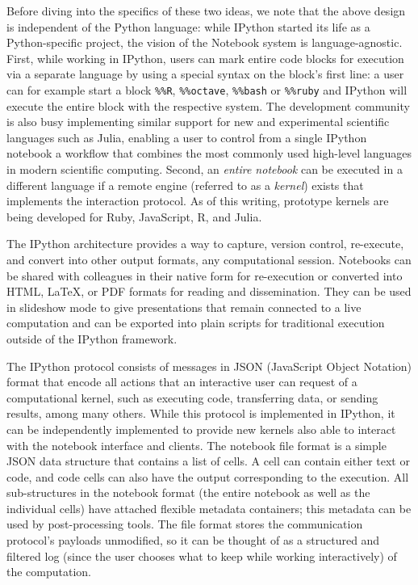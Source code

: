 \documentclass[11pt,oneside,english]{article}
\begin{document}
Before diving into the specifics of these two ideas, we note that the above
design is independent of the Python language: while IPython started its life as
a Python-specific project, the vision of the Notebook system is
language-agnostic.  First, while working in IPython, users can mark entire code
blocks for execution via a separate language by using a special syntax on the
block's first line: a user can for example start a block \texttt{\%\%R},
\texttt{\%\%octave}, \texttt{\%\%bash} or \texttt{\%\%ruby} and IPython will
execute the entire block with the respective system.  The development community
is also busy implementing similar support for new and experimental
scientific languages such as Julia, enabling a user to control from a single
IPython notebook a workflow that combines the most commonly used high-level
languages in modern scientific computing.  Second, an \emph{entire notebook}
can be executed in a different language if a remote engine (referred to as a
\emph{kernel}) exists that implements the interaction protocol.  As of this
writing, prototype kernels are being developed for Ruby, JavaScript, R, and
Julia.

The IPython architecture provides a way to capture, version control, re-execute,
and convert into other output formats, any computational session.  Notebooks
can be shared with colleagues in their native form for re-execution or
converted into HTML, \LaTeX{}, or PDF formats for reading and dissemination.  They
can be used in slideshow mode to give presentations that remain connected to a
live computation and can be exported into plain scripts for traditional
execution outside of the IPython framework.

The IPython protocol consists of messages in JSON (JavaScript Object Notation)
format that encode all actions that an interactive user can request of a
computational kernel, such as executing code, transferring data, or sending
results, among many others.  While this protocol is implemented in IPython, it
can be independently implemented to provide new kernels also able to interact
with the notebook interface and clients.  The notebook file format is a simple
JSON data structure that contains a list of cells.  A cell can contain either
text or code, and code cells can also have the output corresponding to the
execution.  All sub-structures in the notebook format (the entire notebook as
well as the individual cells) have attached flexible metadata containers; this
metadata can be used by post-processing tools.  The file format stores the
communication protocol's payloads unmodified, so it can be thought of as a
structured and filtered log (since the user chooses what to keep while working
interactively) of the computation.  
\end{document}
